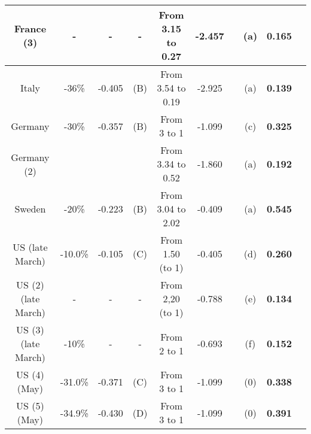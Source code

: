 \documentclass{amsart}
\begin{document}
\begin{table}[htbp]
\begin{tabular}{cccccccccc}
{\footnotesize{}France (3)} & {\footnotesize{}-} & {\footnotesize{}-} & {\footnotesize{}-} & {\footnotesize{}From 3.15 to 0.27} & {\footnotesize{}-2.457} &  & {\footnotesize{}(a)} & \textbf{{\footnotesize{}0.165}} & \tabularnewline
\hline
\midrule
{\footnotesize{}Italy} & {\footnotesize{}-36\%} & {\footnotesize{}-0.405} & {\footnotesize{}(B)} & {\footnotesize{}From 3.54 to 0.19} & {\footnotesize{}-2.925} &  & {\footnotesize{}(a)} & \textbf{{\footnotesize{}0.139}} & \tabularnewline
\hline
\midrule
{\footnotesize{}Germany} & {\footnotesize{}-30\%} & {\footnotesize{}-0.357} & {\footnotesize{}(B)}{\footnotesize{} } & {\footnotesize{}From 3 to 1} & {\footnotesize{}-1.099} &  & {\footnotesize{}(c)} & \textbf{{\footnotesize{}0.325}} & \tabularnewline
{\footnotesize{}Germany (2)} &  &  &  & {\footnotesize{}From 3.34 to 0.52} & {\footnotesize{}-1.860} &  & {\footnotesize{}(a)} & \textbf{{\footnotesize{}0.192}} & \tabularnewline
\hline
\midrule
{\footnotesize{}Sweden} & {\footnotesize{}-20\%} & {\footnotesize{}-0.223} & {\footnotesize{}(B)}{\footnotesize{} } & {\footnotesize{}From 3.04 to 2.02} & {\footnotesize{}-0.409} &  & {\footnotesize{}(a)} & \textbf{{\footnotesize{}0.545}} & \tabularnewline
\hline
\midrule
{\footnotesize{}US (late March)} & {\footnotesize{}-10.0\%} & {\footnotesize{}-0.105} & {\footnotesize{}(C)}{\footnotesize{} } & {\footnotesize{}From 1.50 (to 1)} & {\footnotesize{}-0.405} &  & {\footnotesize{}(d)} & \textbf{{\footnotesize{}0.260}} & \tabularnewline
{\footnotesize{}US (2) (late March)} & - & - & - & {\footnotesize{}From 2,20 (to 1)} & {\footnotesize{}-0.788} &  & {\footnotesize{}(e)} & \textbf{{\footnotesize{}0.134}} & \tabularnewline
{\footnotesize{}US (3) (late March)} & {\footnotesize{}-10\%} & {\footnotesize{}-} & - & {\footnotesize{}From 2 to 1} & {\footnotesize{}-0.693} &  & {\footnotesize{}(f)} & \textbf{{\footnotesize{}0.152}} & \tabularnewline
\hline
\midrule
{\footnotesize{}US (4) (May)} & {\footnotesize{}-31.0\%} & {\footnotesize{}-0.371} & {\footnotesize{}(C)}{\footnotesize{} } & {\footnotesize{}From 3 to 1 } & {\footnotesize{}-1.099} &  & {\footnotesize{}(0)} & \textbf{{\footnotesize{}0.338}} & \tabularnewline
{\footnotesize{}US (5) (May)} & {\footnotesize{}-34.9\%} & {\footnotesize{}-0.430} & {\footnotesize{}(D)}{\footnotesize{} } & {\footnotesize{}From 3 to 1} & {\footnotesize{}-1.099} &  & {\footnotesize{}(0)} & \textbf{{\footnotesize{}0.391}} & \tabularnewline
\hline\hline


\end{tabular}
\end{table}
\end{document}
